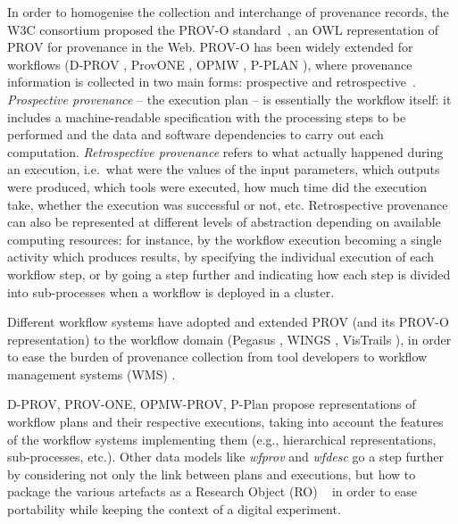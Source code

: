 \documentclass[10pt,letterpaper]{article}
\begin{document}
In order to homogenise the collection and interchange of provenance records, the W3C consortium proposed the PROV-O standard~\cite{Lebo 2013}, an OWL \cite{W3C OWL Working Group 2012} representation of PROV for provenance in the Web.
PROV-O has been widely extended for workflows (D-PROV \cite{Missier 2013}, ProvONE \cite{Cuevas-Vicenttín 2016}, OPMW \cite{Garijo 2011}, P-PLAN \cite{Garijo 2012}), where provenance information is collected in two main forms: prospective and retrospective~\cite{Freire 2008}. \emph{Prospective provenance} -- the execution plan -- is essentially the workflow itself: it includes a machine-readable specification with the processing steps to be performed and the data and software dependencies to carry out each computation.
\emph{Retrospective provenance} refers to what actually happened during an execution, i.e.~what were the values of the input parameters, which outputs were produced, which tools were executed, how much time did the execution take, whether the execution was successful or not, etc.
Retrospective provenance can also be represented at different levels of abstraction depending on available computing resources: for instance, by the workflow execution becoming a single activity which produces results, by specifying the individual execution of each workflow step, or by going a step further and indicating how each step is divided into sub-processes when a workflow is deployed in a cluster.

Different workflow systems have adopted and extended PROV (and its PROV-O representation) to the workflow domain (Pegasus \cite{Deelman 2005}, WINGS \cite{Garijo 2014}, VisTrails \cite{Scheidegger 2008,Costa 2013}), in order to ease the burden of provenance collection from tool developers to workflow management systems (WMS) \cite{Atkinson 2017,Pérez 2018}.

D-PROV, PROV-ONE, OPMW-PROV, P-Plan propose representations of workflow plans and their respective executions, taking into account the features of the workflow systems implementing them (e.g., hierarchical representations, sub-processes, etc.).
Other data models like \emph{wfprov} and \emph{wfdesc}
\cite{Belhajjame 2015} go a step further by considering not only the link between plans and executions, but how to package the various artefacts as a Research Object (RO) ~\cite{Bechhofer 2013} in order to ease portability while keeping the context of a digital experiment.
\end{document}
